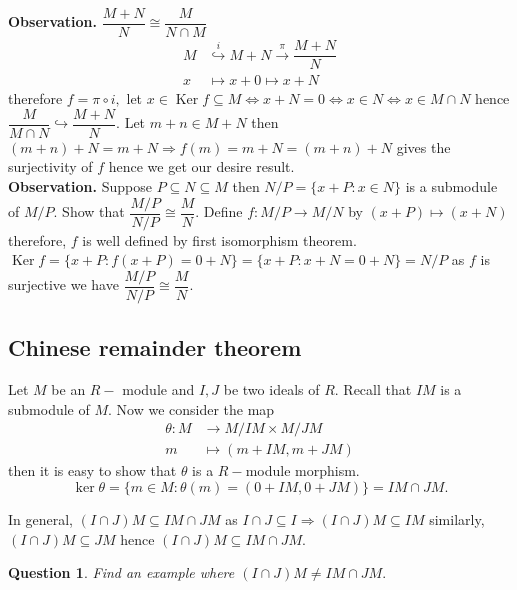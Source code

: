 \documentclass[11pt]{amsart}
\newtheorem{qns}[theorem]{Question}
\begin{document}
\textbf{Observation.} $\dfrac{M+N}{N}\cong \dfrac{M}{N\cap M}$\\ 
\proof \begin{align*} M&\stackrel{i}{\hookrightarrow}M+N\stackrel{\pi}{\rightarrow}\dfrac{M+N}{N}\\
x&\mapsto x+0\mapsto x+N
\end{align*}
therefore $f=\pi \circ i,$ let $x\in \operatorname{Ker}f\subseteq M \Leftrightarrow x+N=0 \Leftrightarrow x\in N\Leftrightarrow x\in M\cap N$ hence $\dfrac{M}{M\cap N}\hookrightarrow \dfrac{M+N}{N}.$ Let $m+n\in M+N$ then $(m+n)+N=m+N \Rightarrow f(m)=m+N=(m+n)+N$ gives the surjectivity of $f$ hence we get our desire result. \\

\textbf{Observation.} Suppose $P\subseteq N\subseteq M$ then $N/P=\{x+P:x\in N\}$ is a submodule of $M/P.$ Show that $\dfrac{M/P}{N/P}\cong \dfrac{M}{N}.$ Define $f:M/P\to M/N$ by $(x+P)\mapsto (x+N)$ therefore, $f$ is well defined by first isomorphism theorem. $\operatorname{Ker}f=\{x+P:f(x+P)=0+N\}=\{x+P:x+N=0+N\}=N/P$ as $f$ is surjective we have $\dfrac{M/P}{N/P}\cong \dfrac{M}{N}.$

\newpage
\subsection{Chinese remainder theorem}
Let $M$ be an $R-$ module and $I,J$ be two ideals of $R$. Recall that $IM$ is a submodule of $M$. Now we consider the map \begin{align*}
\theta: M&\to M/IM\times M/JM\\
m&\mapsto (m+IM,m+JM)
\end{align*}
then it is easy to show that $\theta$ is a $R-$module morphism. $$\ker \theta=\{m\in M: \theta(m)=(0+IM,0+JM)\}=IM\cap JM.$$


 In general, $(I\cap J)M\subseteq IM\cap JM$ as $I\cap J\subseteq I\Rightarrow (I\cap J)M\subseteq IM$ similarly, $(I\cap J)M\subseteq JM$ hence $(I\cap J)M\subseteq IM\cap JM.$ 
 \begin{qns}
 Find an example where $(I\cap J)M\neq IM\cap JM.$ 
 \end{qns}
\end{document}

